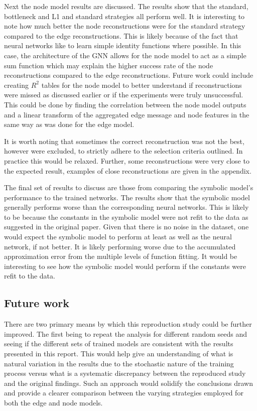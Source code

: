 \documentclass[11pt]{article}
\begin{document}
Next the node model results are discussed. The results show that the standard, bottleneck and L1 and standard strategies all perform well. It is interesting to note how much better the node reconstructions were for the standard strategy compared to the edge reconstructions. This is likely because of the fact that neural networks like to learn simple identity functions where possible. In this case, the architecture of the GNN allows for the node model to act as a simple sum function which may explain the higher success rate of the node reconstructions compared to the edge reconstructions. Future work could include creating $R^2$ tables for the node model to better understand if reconstructions were missed as discussed earlier or if the experiments were truly unsuccessful. This could be done by finding the correlation between the node model outputs and a linear transform of the aggregated edge message and node features in the same way as was done for the edge model.

It is worth noting that sometimes the correct reconstruction was not the best, however were excluded, to strictly adhere to the selection criteria outlined. In practice this would be relaxed. Further, some reconstructions were very close to the expected result, examples of close reconstructions are given in the appendix. 

The final set of results to discuss are those from comparing the symbolic model's performance to the trained networks. The results show that the symbolic model generally performs worse than the corresponding neural networks. This is likely to be because the constants in the symbolic model were not refit to the data as suggested in the original paper. Given that there is no noise in the dataset, one would expect the symbolic model to perform at least as well as the neural network, if not better. It is likely performing worse due to the accumulated approximation error from the multiple levels of function fitting. It would be interesting to see how the symbolic model would perform if the constants were refit to the data.

\subsection{Future work}
    There are two primary means by which this reproduction study could be further improved. The first being to repeat the analysis for different random seeds and seeing if the different sets of trained models are consistent with the results presented in this report. This would help give an understanding of what is natural variation in the results due to the stochastic nature of the training process versus what is a systematic discrepancy between the reproduced study and the original findings. Such an approach would solidify the conclusions drawn and provide a clearer comparison between the varying strategies employed for both the edge and node models.
\end{document}
